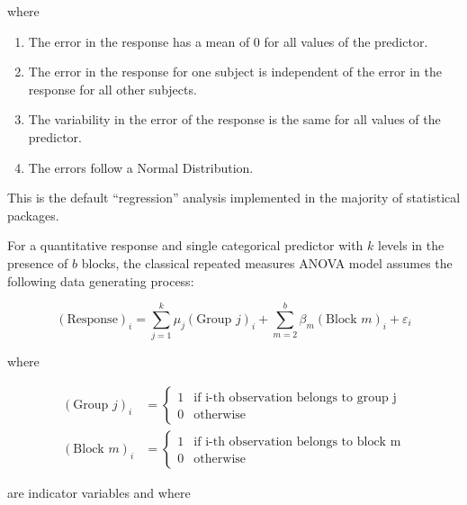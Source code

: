 \documentclass[
  letterpaper,
  DIV=11,
  numbers=noendperiod]{scrreprt}
\providecommand{\tightlist}{%
  \setlength{\itemsep}{0pt}\setlength{\parskip}{0pt}}\usepackage{longtable,booktabs,array}
\theoremstyle{plain}
\theoremstyle{definition}
\theoremstyle{definition}
\theoremstyle{remark}
\begin{document}
where

\begin{enumerate}
\def\labelenumi{\arabic{enumi}.}
\tightlist
\item
  The error in the response has a mean of 0 for all values of the
  predictor.
\item
  The error in the response for one subject is independent of the error
  in the response for all other subjects.
\item
  The variability in the error of the response is the same for all
  values of the predictor.
\item
  The errors follow a Normal Distribution.
\end{enumerate}

This is the default ``regression'' analysis implemented in the majority
of statistical packages.

\begin{description}
\tightlist
\item[Classical Repeated Measures ANOVA Model
(Definition~\ref{def-classical-repeated-measures-anova})]
For a quantitative response and single categorical predictor with \(k\)
levels in the presence of \(b\) blocks, the classical repeated measures
ANOVA model assumes the following data generating process:
\end{description}

\[(\text{Response})_i = \sum_{j=1}^{k} \mu_j (\text{Group } j)_i + \sum_{m=2}^{b} \beta_m (\text{Block } m)_i + \varepsilon_i\]

where

\[
\begin{aligned}
  (\text{Group } j)_{i} &= \begin{cases}
    1 & \text{if i-th observation belongs to group j} \\
    0 & \text{otherwise}
    \end{cases} \\
  (\text{Block } m)_{i} &= \begin{cases}
    1 & \text{if i-th observation belongs to block m} \\
    0 & \text{otherwise}
    \end{cases}
\end{aligned}
\]

are indicator variables and where
\end{document}
